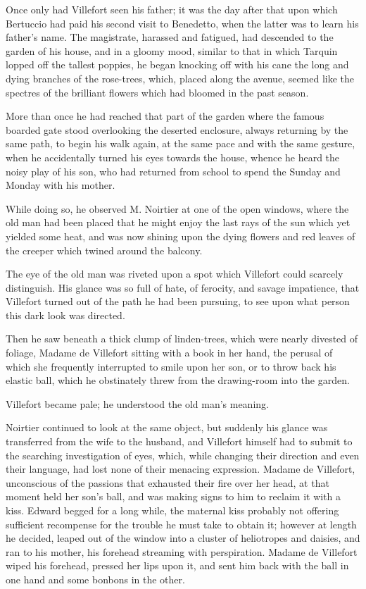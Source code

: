  Once only had Villefort seen his father; it was the day after that upon which Bertuccio had paid his second visit to Benedetto, when the latter was to learn his father's name. The magistrate, harassed and fatigued, had descended to the garden of his house, and in a gloomy mood, similar to that in which Tarquin lopped off the tallest poppies, he began knocking off with his cane the long and dying branches of the rose-trees, which, placed along the avenue, seemed like the spectres of the brilliant flowers which had bloomed in the past season. 

 More than once he had reached that part of the garden where the famous boarded gate stood overlooking the deserted enclosure, always returning by the same path, to begin his walk again, at the same pace and with the same gesture, when he accidentally turned his eyes towards the house, whence he heard the noisy play of his son, who had returned from school to spend the Sunday and Monday with his mother. 

 While doing so, he observed M. Noirtier at one of the open windows, where the old man had been placed that he might enjoy the last rays of the sun which yet yielded some heat, and was now shining upon the dying flowers and red leaves of the creeper which twined around the balcony. 

 The eye of the old man was riveted upon a spot which Villefort could scarcely distinguish. His glance was so full of hate, of ferocity, and savage impatience, that Villefort turned out of the path he had been pursuing, to see upon what person this dark look was directed. 

 Then he saw beneath a thick clump of linden-trees, which were nearly divested of foliage, Madame de Villefort sitting with a book in her hand, the perusal of which she frequently interrupted to smile upon her son, or to throw back his elastic ball, which he obstinately threw from the drawing-room into the garden. 

 Villefort became pale; he understood the old man's meaning. 

 Noirtier continued to look at the same object, but suddenly his glance was transferred from the wife to the husband, and Villefort himself had to submit to the searching investigation of eyes, which, while changing their direction and even their language, had lost none of their menacing expression. Madame de Villefort, unconscious of the passions that exhausted their fire over her head, at that moment held her son's ball, and was making signs to him to reclaim it with a kiss. Edward begged for a long while, the maternal kiss probably not offering sufficient recompense for the trouble he must take to obtain it; however at length he decided, leaped out of the window into a cluster of heliotropes and daisies, and ran to his mother, his forehead streaming with perspiration. Madame de Villefort wiped his forehead, pressed her lips upon it, and sent him back with the ball in one hand and some bonbons in the other. 

